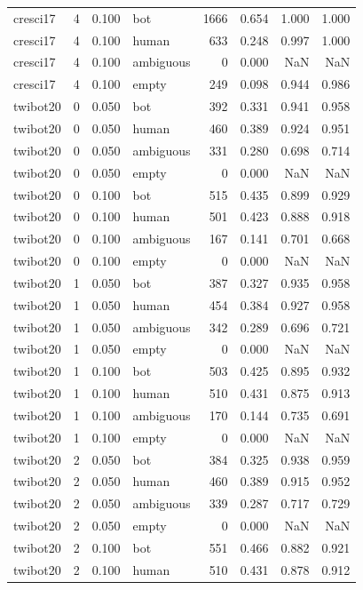 \begin{tabular}{lrrlrrrr}
cresci17 & 4 & 0.100 & bot & 1666 & 0.654 & 1.000 & 1.000 \\
cresci17 & 4 & 0.100 & human & 633 & 0.248 & 0.997 & 1.000 \\
cresci17 & 4 & 0.100 & ambiguous & 0 & 0.000 & NaN & NaN \\
cresci17 & 4 & 0.100 & empty & 249 & 0.098 & 0.944 & 0.986 \\
twibot20 & 0 & 0.050 & bot & 392 & 0.331 & 0.941 & 0.958 \\
twibot20 & 0 & 0.050 & human & 460 & 0.389 & 0.924 & 0.951 \\
twibot20 & 0 & 0.050 & ambiguous & 331 & 0.280 & 0.698 & 0.714 \\
twibot20 & 0 & 0.050 & empty & 0 & 0.000 & NaN & NaN \\
twibot20 & 0 & 0.100 & bot & 515 & 0.435 & 0.899 & 0.929 \\
twibot20 & 0 & 0.100 & human & 501 & 0.423 & 0.888 & 0.918 \\
twibot20 & 0 & 0.100 & ambiguous & 167 & 0.141 & 0.701 & 0.668 \\
twibot20 & 0 & 0.100 & empty & 0 & 0.000 & NaN & NaN \\
twibot20 & 1 & 0.050 & bot & 387 & 0.327 & 0.935 & 0.958 \\
twibot20 & 1 & 0.050 & human & 454 & 0.384 & 0.927 & 0.958 \\
twibot20 & 1 & 0.050 & ambiguous & 342 & 0.289 & 0.696 & 0.721 \\
twibot20 & 1 & 0.050 & empty & 0 & 0.000 & NaN & NaN \\
twibot20 & 1 & 0.100 & bot & 503 & 0.425 & 0.895 & 0.932 \\
twibot20 & 1 & 0.100 & human & 510 & 0.431 & 0.875 & 0.913 \\
twibot20 & 1 & 0.100 & ambiguous & 170 & 0.144 & 0.735 & 0.691 \\
twibot20 & 1 & 0.100 & empty & 0 & 0.000 & NaN & NaN \\
twibot20 & 2 & 0.050 & bot & 384 & 0.325 & 0.938 & 0.959 \\
twibot20 & 2 & 0.050 & human & 460 & 0.389 & 0.915 & 0.952 \\
twibot20 & 2 & 0.050 & ambiguous & 339 & 0.287 & 0.717 & 0.729 \\
twibot20 & 2 & 0.050 & empty & 0 & 0.000 & NaN & NaN \\
twibot20 & 2 & 0.100 & bot & 551 & 0.466 & 0.882 & 0.921 \\
twibot20 & 2 & 0.100 & human & 510 & 0.431 & 0.878 & 0.912 \\

\end{tabular}
